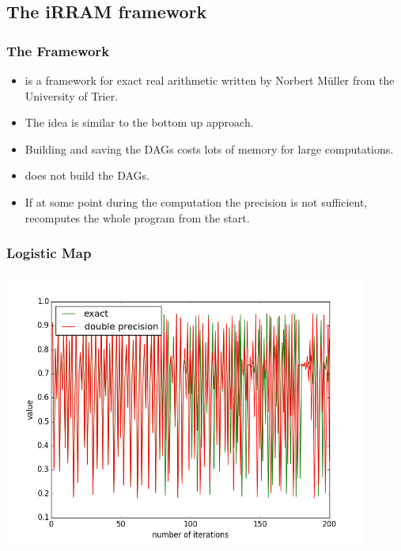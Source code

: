 \subsection{The iRRAM framework}
\begin{frame}
  \frametitle{The \irram Framework}
  \begin{itemize}[<+->]
    \item \irram is a \cc framework for exact real arithmetic written by Norbert M\"{u}ller from the University of Trier.
      \item The idea is similar to the bottom up approach.
    \item Building and saving the DAGs costs lots of memory for large computations.
    \item \irram does not build the DAGs.
    \item If at some point during the computation the precision is not sufficient, \irram recomputes the whole program from the start.
  \end{itemize}
\end{frame}
\begin{frame}
  \begin{minipage}{0.47\textwidth}
  
  \end{minipage}
  \hfill
  \pause
  \noindent{}
\end{frame}
\begin{frame}
  \centering
  \frametitle{Logistic Map}
    \includegraphics[width=0.9\textwidth]{logistic_map}
\end{frame}
